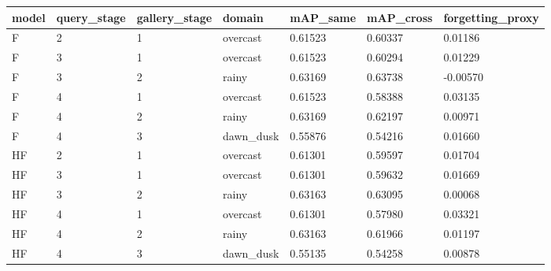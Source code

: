 \begin{tabular}{lllllll}
\toprule
model & query\_stage & gallery\_stage & domain & mAP\_same & mAP\_cross & forgetting\_proxy \\
\midrule
F & 2 & 1 & overcast & 0.61523 & 0.60337 & 0.01186 \\
F & 3 & 1 & overcast & 0.61523 & 0.60294 & 0.01229 \\
F & 3 & 2 & rainy & 0.63169 & 0.63738 & -0.00570 \\
F & 4 & 1 & overcast & 0.61523 & 0.58388 & 0.03135 \\
F & 4 & 2 & rainy & 0.63169 & 0.62197 & 0.00971 \\
F & 4 & 3 & dawn\_dusk & 0.55876 & 0.54216 & 0.01660 \\
HF & 2 & 1 & overcast & 0.61301 & 0.59597 & 0.01704 \\
HF & 3 & 1 & overcast & 0.61301 & 0.59632 & 0.01669 \\
HF & 3 & 2 & rainy & 0.63163 & 0.63095 & 0.00068 \\
HF & 4 & 1 & overcast & 0.61301 & 0.57980 & 0.03321 \\
HF & 4 & 2 & rainy & 0.63163 & 0.61966 & 0.01197 \\
HF & 4 & 3 & dawn\_dusk & 0.55135 & 0.54258 & 0.00878 \\
\bottomrule
\end{tabular}
